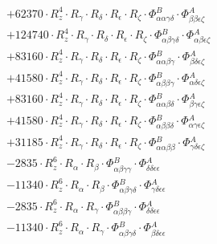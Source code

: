 \documentclass{article}
\begin{document}
\begin{subequations}
\begin{gather}
\begin{array}{c}
 \\[0.2em] 		 + 62370 \cdot R_{z}^{4} \cdot R_{\gamma{}} \cdot R_{\delta{}} \cdot R_{\epsilon{}} \cdot R_{\zeta{}} \cdot \Phi{}^{B}_{\alpha{}\alpha{}\gamma{}\delta{}} \cdot \Phi{}^{A}_{\beta{}\beta{}\epsilon{}\zeta{}} 
 \\[0.2em] 		 + 124740 \cdot R_{z}^{4} \cdot R_{\gamma{}} \cdot R_{\delta{}} \cdot R_{\epsilon{}} \cdot R_{\zeta{}} \cdot \Phi{}^{B}_{\alpha{}\beta{}\gamma{}\delta{}} \cdot \Phi{}^{A}_{\alpha{}\beta{}\epsilon{}\zeta{}} 
 \\[0.2em] 		 + 83160 \cdot R_{z}^{4} \cdot R_{\gamma{}} \cdot R_{\delta{}} \cdot R_{\epsilon{}} \cdot R_{\zeta{}} \cdot \Phi{}^{B}_{\alpha{}\alpha{}\beta{}\gamma{}} \cdot \Phi{}^{A}_{\beta{}\delta{}\epsilon{}\zeta{}} 
 \\[0.2em] 		 + 41580 \cdot R_{z}^{4} \cdot R_{\gamma{}} \cdot R_{\delta{}} \cdot R_{\epsilon{}} \cdot R_{\zeta{}} \cdot \Phi{}^{B}_{\alpha{}\beta{}\beta{}\gamma{}} \cdot \Phi{}^{A}_{\alpha{}\delta{}\epsilon{}\zeta{}} 
 \\[0.2em] 		 + 83160 \cdot R_{z}^{4} \cdot R_{\gamma{}} \cdot R_{\delta{}} \cdot R_{\epsilon{}} \cdot R_{\zeta{}} \cdot \Phi{}^{B}_{\alpha{}\alpha{}\beta{}\delta{}} \cdot \Phi{}^{A}_{\beta{}\gamma{}\epsilon{}\zeta{}} 
 \\[0.2em] 		 + 41580 \cdot R_{z}^{4} \cdot R_{\gamma{}} \cdot R_{\delta{}} \cdot R_{\epsilon{}} \cdot R_{\zeta{}} \cdot \Phi{}^{B}_{\alpha{}\beta{}\beta{}\delta{}} \cdot \Phi{}^{A}_{\alpha{}\gamma{}\epsilon{}\zeta{}} 
 \\[0.2em] 		 + 31185 \cdot R_{z}^{4} \cdot R_{\gamma{}} \cdot R_{\delta{}} \cdot R_{\epsilon{}} \cdot R_{\zeta{}} \cdot \Phi{}^{B}_{\alpha{}\alpha{}\beta{}\beta{}} \cdot \Phi{}^{A}_{\gamma{}\delta{}\epsilon{}\zeta{}} 
 \\[0.2em] 		 - 2835 \cdot R_{z}^{6} \cdot R_{\alpha{}} \cdot R_{\beta{}} \cdot \Phi{}^{B}_{\alpha{}\beta{}\gamma{}\gamma{}} \cdot \Phi{}^{A}_{\delta{}\delta{}\epsilon{}\epsilon{}} 
 \\[0.2em] 		 - 11340 \cdot R_{z}^{6} \cdot R_{\alpha{}} \cdot R_{\beta{}} \cdot \Phi{}^{B}_{\alpha{}\beta{}\gamma{}\delta{}} \cdot \Phi{}^{A}_{\gamma{}\delta{}\epsilon{}\epsilon{}} 
 \\[0.2em] 		 - 2835 \cdot R_{z}^{6} \cdot R_{\alpha{}} \cdot R_{\gamma{}} \cdot \Phi{}^{B}_{\alpha{}\beta{}\beta{}\gamma{}} \cdot \Phi{}^{A}_{\delta{}\delta{}\epsilon{}\epsilon{}} 
 \\[0.2em] 		 - 11340 \cdot R_{z}^{6} \cdot R_{\alpha{}} \cdot R_{\gamma{}} \cdot \Phi{}^{B}_{\alpha{}\beta{}\gamma{}\delta{}} \cdot \Phi{}^{A}_{\beta{}\delta{}\epsilon{}\epsilon{}} 

\end{array}
\end{gather}
\end{subequations}
\end{document}
